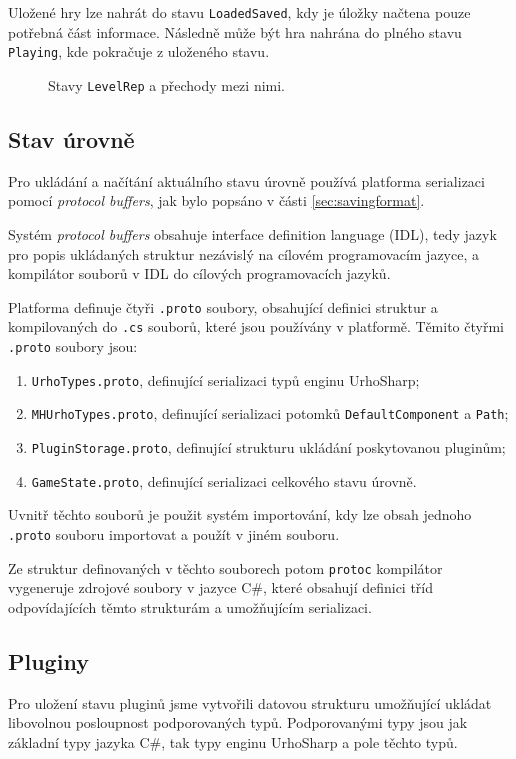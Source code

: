 Uložené hry lze nahrát do stavu \texttt{LoadedSaved}, kdy je úložky načtena pouze potřebná část informace. Následně může být hra nahrána do plného stavu \texttt{Playing}, kde pokračuje z uloženého stavu.

\begin{figure}[h]
	\centering
	\fontsize{8pt}{11pt}\selectfont
	\def\svgwidth{\textwidth}
	
	\caption{Stavy \texttt{LevelRep} a přechody mezi nimi.}
	\label{fig:levelrepstates}
\end{figure}

\subsection{Stav úrovně}
Pro ukládání a načítání aktuálního stavu úrovně používá platforma serializaci pomocí \textit{protocol buffers}, jak bylo popsáno v části \ref{sec:savingformat}. 

Systém \textit{protocol buffers} obsahuje interface definition language (IDL), tedy jazyk pro popis ukládaných struktur nezávislý na cílovém programovacím jazyce, a kompilátor souborů v IDL do cílových programovacích jazyků. 

Platforma definuje čtyři \texttt{.proto} soubory, obsahující definici struktur a kompilovaných do \texttt{.cs} souborů, které jsou používány v platformě. Těmito čtyřmi \texttt{.proto} soubory jsou:

\begin{enumerate}
	\item \texttt{UrhoTypes.proto}, definující serializaci typů enginu UrhoSharp;
	\item \texttt{MHUrhoTypes.proto}, definující serializaci potomků \texttt{DefaultComponent} a \texttt{Path};
	\item \texttt{PluginStorage.proto}, definující strukturu ukládání poskytovanou pluginům;
	\item \texttt{GameState.proto}, definující serializaci celkového stavu úrovně.
\end{enumerate}

Uvnitř těchto souborů je použit systém importování, kdy lze obsah jednoho \texttt{.proto} souboru importovat a použít v jiném souboru. 

Ze struktur definovaných v těchto souborech potom \texttt{protoc} kompilátor vygeneruje zdrojové soubory v jazyce C\#, které obsahují definici tříd odpovídajících těmto strukturám a umožňujícím serializaci.

\subsection{Pluginy}
Pro uložení stavu pluginů jsme vytvořili datovou strukturu umožňující ukládat libovolnou posloupnost podporovaných typů. Podporovanými typy jsou jak základní typy jazyka C\#, tak typy enginu UrhoSharp a pole těchto typů.

